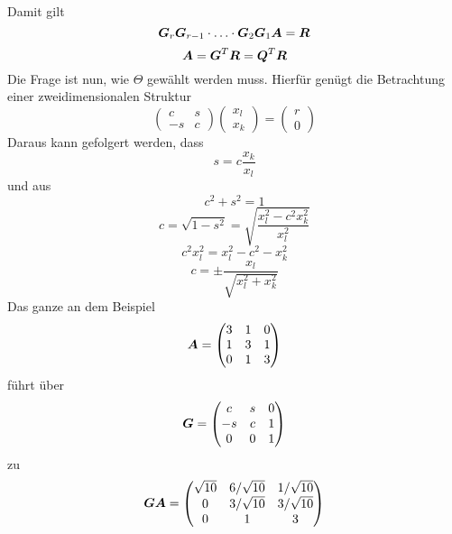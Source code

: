 Damit gilt
\begin{equation}
	\boldsymbol {G}_r \boldsymbol {G}_{r - 1} \cdot \ldots \cdot \boldsymbol {G}_2 \boldsymbol {G}_1 \boldsymbol {A} = \boldsymbol {R}
\end{equation}
\begin{equation}
	\boldsymbol {A} = \boldsymbol {G}^T \boldsymbol {R} = \boldsymbol {Q}^T \boldsymbol {R}
\end{equation}
Die Frage ist nun, wie $\Theta$ gewählt werden muss. Hierfür genügt die Betrachtung einer zweidimensionalen Struktur
\begin{equation}
	\begin{pmatrix}
		c & s \\
		-s & c
	\end{pmatrix} 
	\begin{pmatrix}
		x_l \\
		x_k
	\end{pmatrix} = 
	\begin{pmatrix}
		r \\
		0
	\end{pmatrix}
\end{equation}
Daraus kann gefolgert werden, dass
\begin{equation}
	s = c \frac{x_k}{x_l}
\end{equation}
und aus
\begin{equation}
	c^2 + s^2 = 1
\end{equation}
\begin{equation}
	c = \sqrt{1 - s^2} = \sqrt{\frac{x_l^2 - c^2 x_k^2}{x_l^2}}
\end{equation}
\begin{equation}
	c^2 x_l^2 = x_l^2 - c^2 - x_k^2
\end{equation}
\begin{equation}
	c = \pm \frac{x_l}{\sqrt{x_l^2 + x_k^2}}
\end{equation}
Das ganze an dem Beispiel
\begin{equation}
	\boldsymbol {A} = 
	\begin{pmatrix}
		3 & 1 & 0 \\
		1 & 3 & 1 \\
		0 & 1 & 3	
	\end{pmatrix}
\end{equation}
führt über
\begin{equation}
	\boldsymbol {G} = 
	\begin{pmatrix}
		c & s & 0 \\
		-s & c & 1 \\
		0 & 0 & 1	
	\end{pmatrix}
\end{equation}
zu
\begin{equation}
	\boldsymbol {G} \boldsymbol {A} =
	\begin{pmatrix}
		\sqrt{10} & 6/\sqrt{10} & 1/\sqrt{10} \\
		0 & 3/\sqrt{10} & 3/\sqrt{10} \\
		0 & 1 & 3	
	\end{pmatrix}
\end{equation}